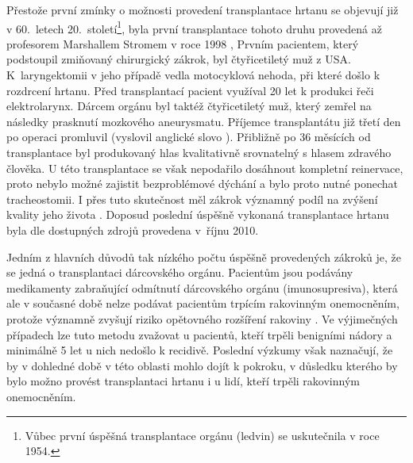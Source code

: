 Přestože první zmínky o možnosti provedení transplantace hrtanu se objevují již v 60.~letech 20.~století\footnote{Vůbec první úspěšná transplantace
orgánu (ledvin) se uskutečnila v roce 1954.}, byla první transplantace tohoto druhu provedená
až profesorem Marshallem Stromem v roce 1998 \cite{Narula2011},  
Prvním pacientem, který podstoupil zmiňovaný chirurgický zákrok, byl čtyřicetiletý muž z USA.
K~laryngektomii v jeho případě vedla motocyklová nehoda, při které došlo k rozdrcení hrtanu. Před transplantací pacient využíval 20 let k produkci řeči elektrolarynx. Dárcem orgánu byl taktéž čtyřicetiletý muž, který zemřel na následky prasknutí mozkového aneurysmatu. Příjemce transplantátu již třetí den po operaci promluvil (vyslovil
anglické slovo ). Přibližně po 36 měsících od transplantace byl
produkovaný hlas kvalitativně srovnatelný s hlasem zdravého člověka. U této transplantace se však nepodařilo dosáhnout kompletní reinervace, proto nebylo možné zajistit bezproblémové dýchání a bylo proto nutné
ponechat tracheostomii. I přes tuto skutečnost měl zákrok významný podíl na zvýšení kvality jeho života
\cite{Strome2001}. Doposud poslední úspěšně vykonaná transplantace hrtanu byla
dle dostupných zdrojů provedena v~říjnu 2010.



Jedním z hlavních důvodů tak nízkého počtu úspěšně provedených zákroků je, že se jedná o transplantaci dárcovského orgánu. Pacientům jsou podávány medikamenty zabraňující odmítnutí dárcovského orgánu (imunosupresiva), která ale v současné době nelze podávat pacientům trpícím rakovinným onemocněním, protože významně zvyšují riziko opětovného rozšíření rakoviny \cite{Narula2011}. Ve výjimečných případech lze tuto metodu zvažovat u pacientů, kteří trpěli benigními nádory a minimálně 5 let u nich nedošlo k recidivě.
Poslední výzkumy však naznačují, že by v dohledné době v této oblasti mohlo dojít k pokroku, v důsledku kterého by bylo možno provést transplantaci hrtanu i u lidí, kteří trpěli rakovinným onemocněním.

